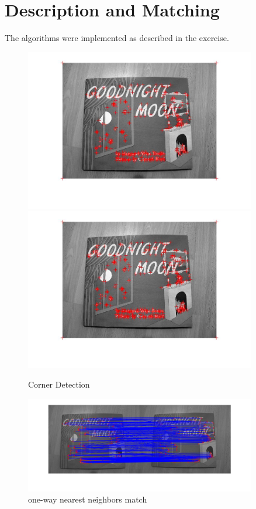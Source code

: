 \documentclass[12pt]{article}
\begin{document}
\section{Description and Matching}

The algorithms were implemented as described in the exercise. 

\vspace{5mm}
\begin{figure}[ht]
	\centering
	\includegraphics[width=0.9\textwidth]{20.jpg}
	\includegraphics[width=0.9\textwidth]{21.jpg}
	\caption{Corner Detection}
	\label{fig1}
\end{figure}
\begin{figure}[ht]
	\centering
	\includegraphics[width=0.9\textwidth]{22.jpg}
	\caption{ one-way nearest neighbors match}
	\label{fig1}
\end{figure}
\end{document}
